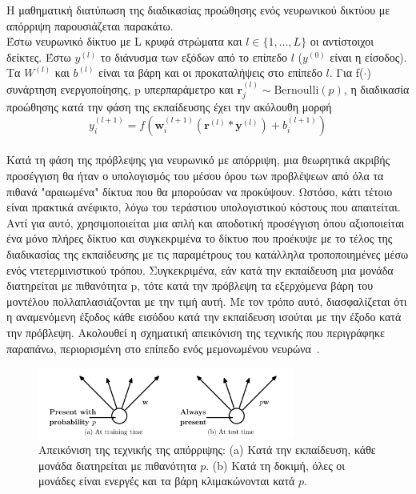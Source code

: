 \documentclass[12pt]{article}
\numberwithin{equation}{section}
\begin{document}
\noindent Η μαθηματική διατύπωση της διαδικασίας προώθησης ενός νευρωνικού δικτύου με απόρριψη παρουσιάζεται παρακάτω. \\

\noindent Έστω νευρωνικό δίκτυο με L κρυφά στρώματα και \(l \in \{1, \ldots, L\}
\) οι αντίστοιχοι δείκτες. Έστω  \( y^{(l)} \) το διάνυσμα των εξόδων από το επίπεδο \( l \) (\( y^{(0)}\) είναι η είσοδος). Τα \( W^{(l)} \) και \( b^{(l)} \) είναι τα βάρη και οι προκαταλήψεις στο επίπεδο \( l \). Για f(\(\cdot\)) συνάρτηση ενεργοποίησης, p υπερπαράμετρο και \(\mathbf{r}^{(l)}_j \sim \text{Bernoulli}(p)\), η διαδικασία προώθησης κατά την φάση της εκπαίδευσης έχει την ακόλουθη μορφή \\

\begin{equation}
y^{(l+1)}_i = f\left(\mathbf{w}^{(l+1)}_i \left(\mathbf{r}^{(l)} \ast \mathbf{y}^{(l)}\right) + b^{(l+1)}_i\right)
\end{equation}\\

Κατά τη φάση της πρόβλεψης για νευρωνικό με απόρριψη, μια θεωρητικά ακριβής προσέγγιση θα ήταν ο υπολογισμός του μέσου όρου των προβλέψεων από όλα τα πιθανά "αραιωμένα" δίκτυα που θα μπορούσαν να προκύψουν. Ωστόσο, κάτι τέτοιο είναι πρακτικά ανέφικτο, λόγω του τεράστιου υπολογιστικού κόστους που απαιτείται. Αντί για αυτό, χρησιμοποιείται μια απλή και αποδοτική προσέγγιση όπου αξιοποιείται ένα μόνο πλήρες δίκτυο και συγκεκριμένα το δίκτυο που προέκυψε με το τέλος της διαδικασίας της εκπαίδευσης με τις παραμέτρους του κατάλληλα τροποποιημένες μέσω ενός ντετερμινιστικού τρόπου. Συγκεκριμένα, εάν κατά την εκπαίδευση μια μονάδα διατηρείται με πιθανότητα p, τότε κατά την πρόβλεψη τα εξερχόμενα βάρη του μοντέλου πολλαπλασιάζονται με την τιμή αυτή. Με τον τρόπο αυτό, διασφαλίζεται ότι η αναμενόμενη έξοδος κάθε εισόδου κατά την εκπαίδευση ισούται με την έξοδο κατά την πρόβλεψη. Ακολουθεί η σχηματική απεικόνιση της τεχνικής που περιγράφηκε παραπάνω, περιορισμένη στο επίπεδο ενός μεμονωμένου νευρώνα~\cite{JMLR:v15:srivastava14a}.
\\

\begin{figure}[h!]
  \centering
  \includegraphics[width=0.75\textwidth]{images/dropout.png} %
  \caption{Απεικόνιση της τεχνικής της απόρριψης: (a) Κατά την εκπαίδευση, κάθε μονάδα διατηρείται με πιθανότητα $p$. (b) Κατά τη δοκιμή, όλες οι μονάδες είναι ενεργές και τα βάρη κλιμακώνονται κατά $p$.}
  \label{figure 17}
\end{figure}
\end{document}
